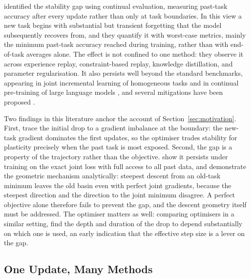 \citet{delange2023continualevaluationlifelonglearning} identified the stability gap using continual evaluation, measuring past-task accuracy after every update rather than only at task boundaries. In this view a new task begins with substantial but transient forgetting that the model subsequently recovers from, and they quantify it with worst-case metrics, mainly the minimum past-task accuracy reached during training, rather than with end-of-task averages alone. The effect is not confined to one method: they observe it across experience replay, constraint-based replay, knowledge distillation, and parameter regularisation. It also persists well beyond the standard benchmarks, appearing in joint incremental learning of homogeneous tasks \cite{kamath2024expandingscopestabilitygap} and in continual pre-training of large language models \cite{guo2024efficientcontinualpretrainingmitigating}, and several mitigations have been proposed \cite{soutifcormerais2023improvingonlinecontinuallearning, harun2024overcomingstabilitygapcontinual}.

Two findings in this literature anchor the account of Section~\ref{sec:motivation}. First, \citet{delange2023continualevaluationlifelonglearning} trace the initial drop to a gradient imbalance at the boundary: the new-task gradient dominates the first updates, so the optimiser trades stability for plasticity precisely when the past task is most exposed. Second, the gap is a property of the trajectory rather than the objective. \citet{hess2024complementaryperspectivescontinuallearning} show it persists under training on the exact joint loss with full access to all past data, and \citet{kao2021naturalcontinuallearningsuccess} demonstrate the geometric mechanism analytically: steepest descent from an old-task minimum leaves the old basin even with perfect joint gradients, because the steepest direction and the direction to the joint minimum disagree. A perfect objective alone therefore fails to prevent the gap, and the descent geometry itself must be addressed. The optimiser matters as well: comparing optimisers in a similar setting, \citet{obis2025optimizersstabilitygap} find the depth and duration of the drop to depend substantially on which one is used, an early indication that the effective step size is a lever on the gap.

\subsection{One Update, Many Methods}
\label{subsec:path_finding}

